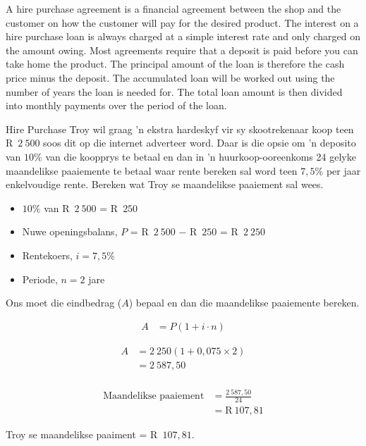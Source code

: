 A hire purchase agreement is a financial agreement between the shop and the customer on how the customer will pay for the desired product. The interest on a hire purchase loan is always charged at a simple interest rate and only charged on the amount owing. Most agreements require that a deposit is paid before you can take home the product. The principal amount of the loan is therefore the cash price minus the deposit. The accumulated loan will be worked out using the number of years the loan is needed for. The total loan amount is then divided into monthly payments over the period of the loan.


\begin{wex}{Hire Purchase}{
    Troy wil graag ’n ekstra hardeskyf vir sy
skootrekenaar koop teen R~$2~500$ soos dit op die internet adverteer word.
Daar is die opsie om ’n deposito van $10\%$ van die koopprys te betaal
en dan in ’n huurkoop-ooreenkoms 24 gelyke maandelikse paaiemente
te betaal waar rente bereken sal word teen $7,5\%$ per jaar enkelvoudige
rente. Bereken wat Troy se maandelikse paaiement sal wees.}{

    \begin{itemize}
	\item $10\%$ van R~$2~500$ = R~$250$\\
	\item Nuwe openingsbalans, $P$ = R~$2~500$ − R~$250$ = R~$2~250$\\
	\item Rentekoers, $i = 7,5\%$\\
	\item Periode, $n = 2$ jare
    \end{itemize}

    Ons moet die eindbedrag ($A$) bepaal en dan die maandelikse
paaiemente bereken.

    \begin{align*}
	    A &= P(1 + i \cdot n)
    \end{align*}

    \begin{align*}
	A &= 2~250(1 + 0,075 \times 2)\\
	  &= 2~587,50\\
    \end{align*}

    \begin{align*}
	\text{Maandelikse paaiement} &= \frac{2~587,50}{24}\\
			&= \text{R}~107,81
    \end{align*}

    Troy se maandelikse paaiment = R~$107,81$.
}
\end{wex}



